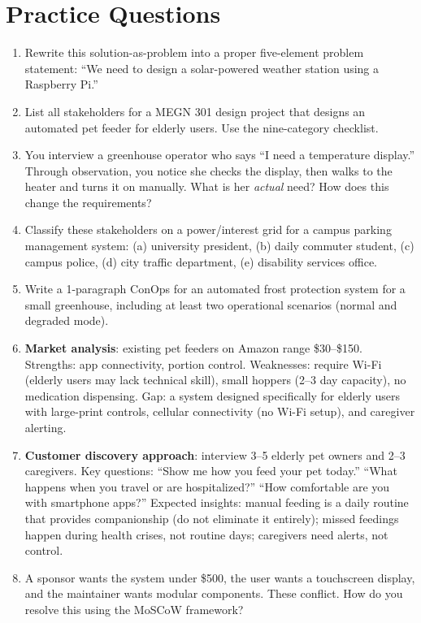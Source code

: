 \documentclass[11pt,letterpaper,twoside,openany]{book}
\begin{document}
\section{Practice Questions}
\begin{enumerate}[leftmargin=1.5em]
\item Rewrite this solution-as-problem into a proper five-element problem statement: ``We need to design a solar-powered weather station using a Raspberry Pi.''
\item List all stakeholders for a MEGN 301 design project that designs an automated pet feeder for elderly users. Use the nine-category checklist.
\item You interview a greenhouse operator who says ``I need a temperature display.'' Through observation, you notice she checks the display, then walks to the heater and turns it on manually. What is her \emph{actual} need? How does this change the requirements?
\item Classify these stakeholders on a power/interest grid for a campus parking management system: (a) university president, (b) daily commuter student, (c) campus police, (d) city traffic department, (e) disability services office.
\item Write a 1-paragraph ConOps for an automated frost protection system for a small greenhouse, including at least two operational scenarios (normal and degraded mode).

\item \textbf{Market analysis}: existing pet feeders on Amazon range \$30--\$150. Strengths: app connectivity, portion control. Weaknesses: require Wi-Fi (elderly users may lack technical skill), small hoppers (2--3 day capacity), no medication dispensing. Gap: a system designed specifically for elderly users with large-print controls, cellular connectivity (no Wi-Fi setup), and caregiver alerting.

\item \textbf{Customer discovery approach}: interview 3--5 elderly pet owners and 2--3 caregivers. Key questions: ``Show me how you feed your pet today.'' ``What happens when you travel or are hospitalized?'' ``How comfortable are you with smartphone apps?'' Expected insights: manual feeding is a daily routine that provides companionship (do not eliminate it entirely); missed feedings happen during health crises, not routine days; caregivers need alerts, not control.

\item A sponsor wants the system under \$500, the user wants a touchscreen display, and the maintainer wants modular components. These conflict. How do you resolve this using the MoSCoW framework?
\end{enumerate}
\end{document}
